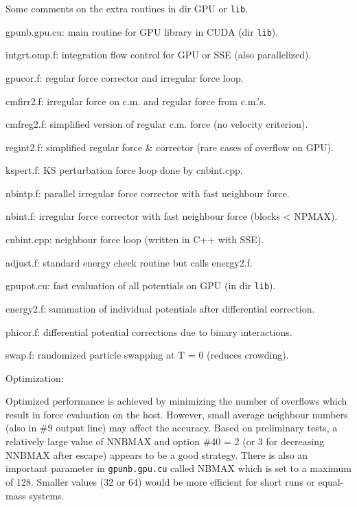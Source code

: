 \documentclass[12pt]{article}
\begin{document}
\medskip
Some comments on the extra routines in dir GPU or {\tt lib}.

\medskip
\noindent
gpunb.gpu.cu: main routine for GPU library in CUDA (dir {\tt lib}).

\medskip
\noindent
intgrt.omp.f: integration flow control for GPU or SSE (also parallelized).

\medskip
\noindent
gpucor.f: regular force corrector and irregular force loop.

\medskip
\noindent
cmfirr2.f: irregular force on c.m. and regular force from c.m.'s.

\medskip
\noindent
cmfreg2.f: simplified version of regular c.m. force (no velocity criterion).

\medskip
\noindent
regint2.f: simplified regular force \& corrector (rare cases of overflow on GPU).

\medskip
\noindent
kspert.f: KS perturbation force loop done by cnbint.cpp.

\medskip
\noindent
nbintp.f: parallel irregular force corrector with fast neighbour force.

\medskip
\noindent
nbint.f: irregular force corrector with fast neighbour force (blocks < NPMAX).

\medskip
\noindent
cnbint.cpp: neighbour force loop (written in C++ with SSE).

\medskip
\noindent
adjust.f: standard energy check routine but calls energy2.f.

\medskip
\noindent
gpupot.cu: fast evaluation of all potentials on GPU (in dir {\tt lib}).

\medskip
\noindent
energy2.f: summation of individual potentials after differential correction.

\medskip
\noindent
phicor.f: differential potential corrections due to binary interactions.

\medskip
\noindent
swap.f: randomized particle swapping at T = 0 (reduces crowding).

\medskip
\medskip
\noindent
Optimization:

\medskip
Optimized performance is achieved by minimizing the number of overflows
which result in force evaluation on the host.
However, small average neighbour numbers (also in \#9 output line) may affect
the accuracy. Based on preliminary tests, a relatively large value of
NNBMAX and option \#40 = 2 (or 3 for decreasing NNBMAX after escape)
appears to be a good strategy. There is also an important parameter in
{\tt gpunb.gpu.cu} called NBMAX which is set to a maximum of 128.
Smaller values (32 or 64) would be more efficient for short runs or
equal-mass systems.
\end{document}
